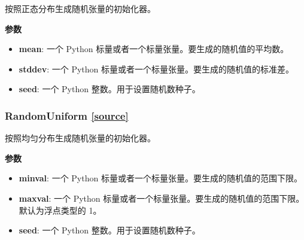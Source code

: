 \begin{Shaded}
\begin{Highlighting}[]
\OperatorTok{=}\OperatorTok{=}\OperatorTok{=}\NormalTok{)}
\end{Highlighting}
\end{Shaded}

按照正态分布生成随机张量的初始化器。

\textbf{参数}

\begin{itemize}
\tightlist
\item
  \textbf{mean}: 一个 Python
  标量或者一个标量张量。要生成的随机值的平均数。
\item
  \textbf{stddev}: 一个 Python
  标量或者一个标量张量。要生成的随机值的标准差。
\item
  \textbf{seed}: 一个 Python 整数。用于设置随机数种子。
\end{itemize}




\subsubsection{RandomUniform {\href{https://github.com/keras-team/keras/blob/master/keras/initializers.py\#L94}{{[}source{]}}}}

\begin{Shaded}
\begin{Highlighting}[]
\OperatorTok{=-}\OperatorTok{=}\OperatorTok{=}\NormalTok{)}
\end{Highlighting}
\end{Shaded}

按照均匀分布生成随机张量的初始化器。

\textbf{参数}

\begin{itemize}
\tightlist
\item
  \textbf{minval}: 一个 Python
  标量或者一个标量张量。要生成的随机值的范围下限。
\item
  \textbf{maxval}: 一个 Python
  标量或者一个标量张量。要生成的随机值的范围下限。默认为浮点类型的 1。
\item
  \textbf{seed}: 一个 Python 整数。用于设置随机数种子。
\end{itemize}




